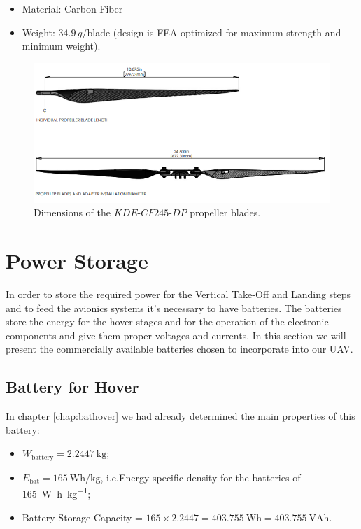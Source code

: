 \documentclass[english,fira]{ist-report}
\begin{document}
\begin{itemize}
    \item Material: Carbon-Fiber
    \item Weight: $34.9\,g$/blade (design is FEA optimized for maximum strength and minimum weight).

\end{itemize}

\begin{figure}[ht]
    \centering
    \includegraphics[width=\textwidth]{graphics/BrushlessMotorsforVtol/propblades2.png}
    \caption{Dimensions of the $KDE$-$CF245$-$DP$ propeller blades.}
    \label{fig:propblades2}
\end{figure}


\chapter{Power Storage}\label{chap:power}
In order to store the required power for the Vertical Take-Off and Landing steps and to feed the avionics systems it’s necessary to have batteries. The batteries store the energy for the hover stages and for the operation of the electronic components and give them proper voltages and currents. In this section we will present the commercially available batteries chosen to incorporate into our UAV. 
\section{Battery for Hover}
In chapter \ref{chap:bathover} we had already determined the main properties of this battery:

\begin{itemize}
    \item $W_{\text{battery}} = \SI{2.2447}{\kilogram}$;
    \item $E_{\text{bat}}=\SI{165}{\watt\hour\per\kilogram}$, i.e.\@ Energy specific density for the batteries of \SI{165}{\watt\hour\per\kilogram};
    \item Battery Storage Capacity = $165\times2.2447=\SI{403.755}{\watt\hour} = \SI{403.755}{\volt\ampere\hour}$.
\end{itemize}
	
\end{document}
